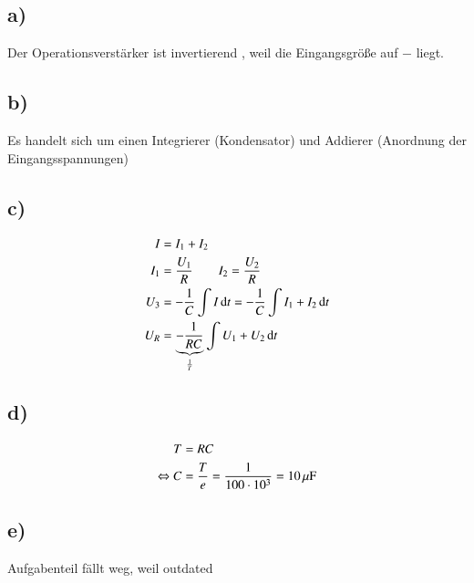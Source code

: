 \subsection*{a)}

Der Operationsverstärker ist invertierend , weil die Eingangsgröße auf $-$ liegt.

\subsection*{b)}

Es handelt sich um einen Integrierer (Kondensator) und Addierer (Anordnung der Eingangsspannungen)


\subsection*{c)}

\begin{align*}
I &= I_1 + I_2 \\
I_1 &= \frac{U_1}{R} \qquad I_2 = \frac{U_2}{R} \\
U_3 &= - \frac{1}{C} \int I \, \mathrm d t = - \frac{1}{C} \int I_1 + I_2 \, \mathrm d t \\
U_R &= \underbrace{ - \frac{1}{RC}}_{\frac{1}{T}} \int U_1 + U_2 \, \mathrm d t
\end{align*}

\subsection*{d)}

\begin{align*}
T &= RC \\ 
\Leftrightarrow C &= \frac{T}{e} = \frac{1}{100 \cdot 10^3} = \unit[10]{\mu F}
\end{align*}


\subsection*{e)}

Aufgabenteil fällt weg, weil outdated





